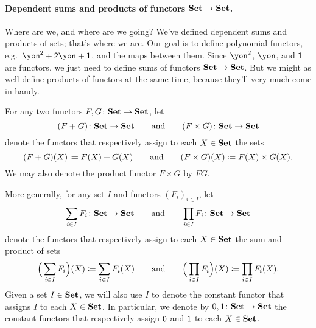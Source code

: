 \documentclass[Book-Poly]{subfiles}
\begin{document}
\paragraph{Dependent sums and products of functors $\textbf{Set}\to\textbf{Set}$.}

Where are we, and where are we going? We've defined dependent sums and products of sets; that's where we are. Our goal is to define polynomial functors, e.g.\ $\yon^\2+\2\yon+\1$, and the maps between them. Since $\yon^2$, $\yon$, and $\textsf{1}$ are functors, we just need to define sums of functors $\textbf{Set}\to\textbf{Set}$. But we might as well define products of functors at the same time, because they'll very much come in handy.

\begin{definition}\label{def.sum_prod}
For any two functors $F,G\colon\textbf{Set}\to\textbf{Set}$, let
\[
  (F+G)\colon\textbf{Set}\to\textbf{Set}
  \qquad\text{and}\qquad
  (F\times G)\colon\textbf{Set}\to\textbf{Set}
\]
denote the functors that respectively assign to each $X\in\textbf{Set}$ the sets
\[
  (F+G)(X)\coloneqq F(X)+G(X)
  \qquad\text{and}\qquad
	(F\times G)(X)\coloneqq F(X)\times G(X).
\]
We may also denote the product functor $F \times G$ by $FG$.

More generally, for any set $I$ and functors $(F_i)_{i\in I}$, let
\[
\sum_{i\in I}F_i\colon\textbf{Set}\to\textbf{Set}
\qquad\text{and}\qquad
\prod_{i\in I}F_i\colon\textbf{Set}\to\textbf{Set}
\]
denote the functors that respectively assign to each $X\in\textbf{Set}$ the sum and product of sets
\[
	\Big(\sum_{i\in I}F_i\Big)(X)\coloneqq\sum_{i\in I} F_i(X)
	\qquad\text{and}\qquad
	\Big(\prod_{i\in I}F_i\Big)(X)\coloneqq\prod_{i\in I} F_i(X).
\]
Given a set $I\in\textbf{Set}$, we will also use $I$ to denote the constant functor that assigns $I$ to each $X\in\textbf{Set}$.
In particular, we denote by $\textsf{0},\textsf{1}\colon\textbf{Set}\to\textbf{Set}$ the constant functors that respectively assign $\textsf{0}$ and $\textsf{1}$ to each $X\in\textbf{Set}$.
\end{definition}
\end{document}
